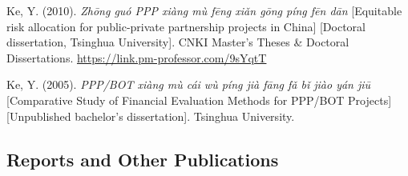 \documentclass[11pt,a4paper]{report} %
\begin{document}
    \begin{tablist}

        \item[2010] \tab{}Ke, Y. (2010). \textit{Zhōng guó PPP xiàng mù fēng xiǎn gōng píng fēn dān} [Equitable risk allocation for public-private partnership projects in China] [Doctoral dissertation, Tsinghua University]. CNKI Master's Theses \& Doctoral Dissertations. \href{https://link.pm-professor.com/9sYqtT}{https://link.pm-professor.com/9sYqtT}

        \item[2005] \tab{}Ke, Y. (2005). \textit{PPP/BOT xiàng mù cái wù píng jià fāng fǎ bǐ jiào yán jiū} [Comparative Study of Financial Evaluation Methods for PPP/BOT Projects] [Unpublished bachelor's dissertation]. Tsinghua University.

    \end{tablist}

    \subsection*{Reports and Other Publications}
\end{document}
